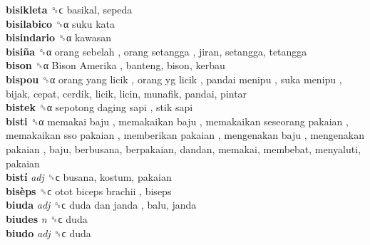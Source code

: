 \textbf{bisikleta} ␝ϲ  basikal, sepeda  \\
\textbf{bisilabico} ␝α   suku kata   \\
\textbf{bisindario} ␝α  kawasan  \\
\textbf{bisiña} ␝α   orang sebelah ,  orang setangga , jiran, setangga, tetangga  \\
\textbf{bison} ␝α   Bison Amerika , banteng, bison, kerbau  \\
\textbf{bispou} ␝α   orang yang licik ,  orang yg licik ,  pandai menipu ,  suka menipu , bijak, cepat, cerdik, licik, licin, munafik, pandai, pintar  \\
\textbf{bistek} ␝α   sepotong daging sapi ,  stik sapi   \\
\textbf{bisti} ␝α   memakai baju ,  memakaikan baju ,  memakaikan seseorang pakaian ,  memakaikan sso pakaian ,  memberikan pakaian ,  mengenakan baju ,  mengenakan pakaian , baju, berbusana, berpakaian, dandan, memakai, membebat, menyaluti, pakaian  \\
\textbf{bistí} \emph{adj}  ␝ϲ  busana, kostum, pakaian  \\
\textbf{bisèps} ␝ϲ   otot biceps brachii , biseps  \\
\textbf{biuda} \emph{adj}  ␝ϲ   duda dan janda , balu, janda  \\
\textbf{biudes} \emph{n}  ␝ϲ  duda  \\
\textbf{biudo} \emph{adj}  ␝ϲ  duda  \\
